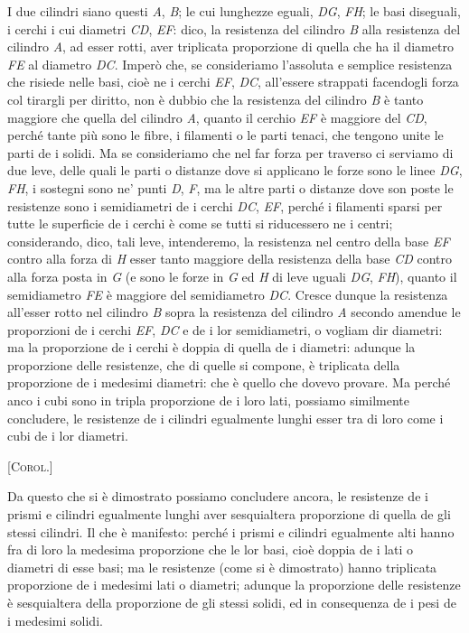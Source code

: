 \documentclass[11pt,twoside,openany]{book}
\newcommand{\propbox}[1]{%
  \par\vspace{0.8em}\noindent%
  {\footnotesize\scshape\textcolor{rubric}{[#1]}}\par\nopagebreak%
}
\begin{document}
I due cilindri siano questi \emph{A}, \emph{B}; le cui lunghezze eguali, \emph{DG}, \emph{FH}; le basi diseguali, i cerchi i cui diametri \emph{CD}, \emph{EF}: dico, la resistenza del cilindro \emph{B} alla resistenza del cilindro \emph{A}, ad esser rotti, aver triplicata proporzione di quella che ha il diametro \emph{FE} al diametro \emph{DC}. Imperò che, se consideriamo l'assoluta e semplice resistenza che risiede nelle basi, cioè ne i cerchi \emph{EF}, \emph{DC}, all'essere strappati facendogli forza col tirargli per diritto, non è dubbio che la resistenza del cilindro \emph{B} è tanto maggiore che quella del cilindro \emph{A}, quanto il cerchio \emph{EF} è maggiore del \emph{CD}, perché tante più sono le fibre, i filamenti o le parti tenaci, che tengono unite le parti de i solidi. Ma se consideriamo che nel far forza per traverso ci serviamo di due leve, delle quali le parti o distanze dove si applicano le forze sono le linee \emph{DG}, \emph{FH}, i sostegni sono ne' punti \emph{D}, \emph{F}, ma le altre parti o distanze dove son poste le resistenze sono i semidiametri de i cerchi \emph{DC}, \emph{EF}, perché i filamenti sparsi per tutte le superficie de i cerchi è come se tutti si riducessero ne i centri; considerando, dico, tali leve, intenderemo, la resistenza nel centro della base \emph{EF} contro alla forza di \emph{H} esser tanto maggiore della resistenza della base \emph{CD} contro alla forza posta in \emph{G} (e sono le forze in \emph{G} ed \emph{H} di leve uguali \emph{DG}, \emph{FH}), quanto il semidiametro \emph{FE} è maggiore del semidiametro \emph{DC}. Cresce dunque la resistenza all'esser rotto nel cilindro \emph{B} sopra la resistenza del cilindro \emph{A} secondo amendue le proporzioni de i cerchi \emph{EF}, \emph{DC} e de i lor semidiametri, o vogliam dir diametri: ma la proporzione de i cerchi è doppia di quella de i diametri: adunque la proporzione delle resistenze, che di quelle si compone, è triplicata della proporzione de i medesimi diametri: che è quello che dovevo provare. Ma perché anco i cubi sono in tripla proporzione de i loro lati, possiamo similmente concludere, le resistenze de i cilindri egualmente lunghi esser tra di loro come i cubi de i lor diametri.


\propbox{Corol.}

Da questo che si è dimostrato possiamo concludere ancora, le resistenze de i prismi e cilindri egualmente lunghi aver sesquialtera proporzione di quella de gli stessi cilindri. Il che è manifesto: perché i prismi e cilindri egualmente alti hanno fra di loro la medesima proporzione che le lor basi, cioè doppia de i lati o diametri di esse basi; ma le resistenze (come si è dimostrato) hanno triplicata proporzione de i medesimi lati o diametri; adunque la proporzione delle resistenze è sesquialtera della proporzione de gli stessi solidi, ed in consequenza de i pesi de i medesimi solidi.
\end{document}
